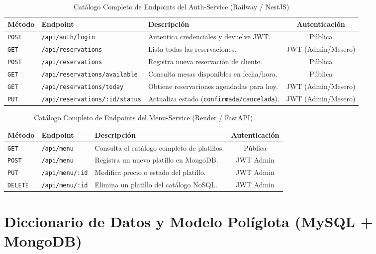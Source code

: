 \documentclass[12pt,a4paper]{article}
\begin{document}
\begin{table}[H]\small\centering
\caption{Catálogo Completo de Endpoints del Auth-Service (Railway / NestJS)}
\begin{tabular}{|l|l|p{4.5cm}|c|}
\hline
\textbf{Método} & \textbf{Endpoint} & \textbf{Descripción} & \textbf{Autenticación} \\ \hline
\texttt{POST} & \texttt{/api/auth/login} & Autentica credenciales y devuelve JWT. & Pública \\ \hline
\texttt{GET} & \texttt{/api/reservations} & Lista todas las reservaciones. & JWT (Admin/Mesero) \\ \hline
\texttt{POST} & \texttt{/api/reservations} & Registra nueva reservación de cliente. & Pública \\ \hline
\texttt{GET} & \texttt{/api/reservations/available} & Consulta mesas disponibles en fecha/hora. & Pública \\ \hline
\texttt{GET} & \texttt{/api/reservations/today} & Obtiene reservaciones agendadas para hoy. & JWT (Admin/Mesero) \\ \hline
\texttt{PUT} & \texttt{/api/reservations/:id/status} & Actualiza estado (\texttt{confirmada/cancelada}). & JWT (Admin/Mesero) \\ \hline
\end{tabular}
\end{table}

\begin{table}[H]\small\centering
\caption{Catálogo Completo de Endpoints del Menu-Service (Render / FastAPI)}
\begin{tabular}{|l|l|p{4.5cm}|c|}
\hline
\textbf{Método} & \textbf{Endpoint} & \textbf{Descripción} & \textbf{Autenticación} \\ \hline
\texttt{GET} & \texttt{/api/menu} & Consulta el catálogo completo de platillos. & Pública \\ \hline
\texttt{POST} & \texttt{/api/menu} & Registra un nuevo platillo en MongoDB. & JWT Admin \\ \hline
\texttt{PUT} & \texttt{/api/menu/:id} & Modifica precio o estado del platillo. & JWT Admin \\ \hline
\texttt{DELETE} & \texttt{/api/menu/:id} & Elimina un platillo del catálogo NoSQL. & JWT Admin \\ \hline
\end{tabular}
\end{table}

\section{Diccionario de Datos y Modelo Políglota (MySQL + MongoDB)}
\end{document}
